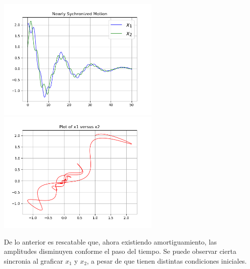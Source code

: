 \documentclass[12pt]{article}
\begin{document}
\begin{center}
    \includegraphics[height=6cm]{G2_4e.png}\hspace*{\fill}
    \includegraphics[height=6cm]{G2_4f.png}\\
\end{center}
De lo anterior es rescatable que, ahora existiendo amortiguamiento, las amplitudes disminuyen conforme el paso del tiempo. Se puede observar cierta sincronia al graficar $x_1$ y $x_2$, a pesar de que tienen distintas condiciones iniciales.
\end{document}
